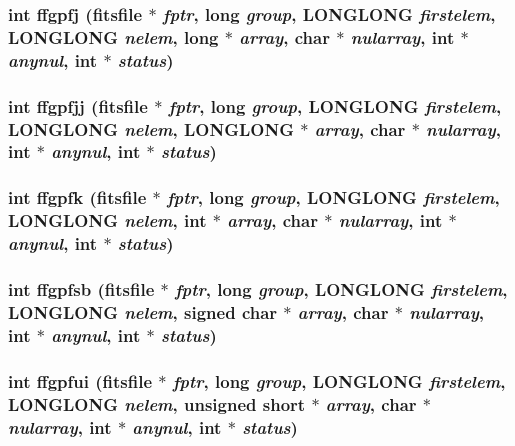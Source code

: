 \subsubsection{\setlength{\rightskip}{0pt plus 5cm}int ffgpfj (\bf{fitsfile} $\ast$ {\em fptr}, long {\em group}, \bf{LONGLONG} {\em firstelem}, \bf{LONGLONG} {\em nelem}, long $\ast$ {\em array}, char $\ast$ {\em nularray}, int $\ast$ {\em anynul}, int $\ast$ {\em status})}\label{fitsio_8h_348a086c25d23b4b453e20483c0552a2}


\subsubsection{\setlength{\rightskip}{0pt plus 5cm}int ffgpfjj (\bf{fitsfile} $\ast$ {\em fptr}, long {\em group}, \bf{LONGLONG} {\em firstelem}, \bf{LONGLONG} {\em nelem}, \bf{LONGLONG} $\ast$ {\em array}, char $\ast$ {\em nularray}, int $\ast$ {\em anynul}, int $\ast$ {\em status})}\label{fitsio_8h_b8dd1aed0cf184dd27347a3ad89bd888}


\subsubsection{\setlength{\rightskip}{0pt plus 5cm}int ffgpfk (\bf{fitsfile} $\ast$ {\em fptr}, long {\em group}, \bf{LONGLONG} {\em firstelem}, \bf{LONGLONG} {\em nelem}, int $\ast$ {\em array}, char $\ast$ {\em nularray}, int $\ast$ {\em anynul}, int $\ast$ {\em status})}\label{fitsio_8h_39fded4193b93f54f993961de406751f}


\subsubsection{\setlength{\rightskip}{0pt plus 5cm}int ffgpfsb (\bf{fitsfile} $\ast$ {\em fptr}, long {\em group}, \bf{LONGLONG} {\em firstelem}, \bf{LONGLONG} {\em nelem}, signed char $\ast$ {\em array}, char $\ast$ {\em nularray}, int $\ast$ {\em anynul}, int $\ast$ {\em status})}\label{fitsio_8h_d9472db2fdb501fccf5c65359329a9d6}


\subsubsection{\setlength{\rightskip}{0pt plus 5cm}int ffgpfui (\bf{fitsfile} $\ast$ {\em fptr}, long {\em group}, \bf{LONGLONG} {\em firstelem}, \bf{LONGLONG} {\em nelem}, unsigned short $\ast$ {\em array}, char $\ast$ {\em nularray}, int $\ast$ {\em anynul}, int $\ast$ {\em status})}\label{fitsio_8h_37540a1aeebbe1a4d6a20df96204a615}


